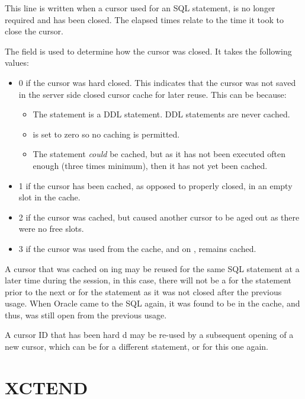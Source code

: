This line is written when a cursor used for an SQL statement, is no longer required and has been closed. The elapsed times relate to the time it took to close the cursor.

The  field is used to determine how the cursor was closed. It takes the following values:

\begin{itemize}
\tightlist
\item
  0 if the cursor was hard closed. This indicates that the cursor was not saved in the server side closed cursor cache for later reuse. This can be because:

  \begin{itemize}
  \tightlist
  \item
    The statement is a DDL statement. DDL statements are never cached.
  \item
     is set to zero so no caching is permitted.
  \item
    The statement \emph{could} be cached, but as it has not been executed often enough (three times minimum), then it has not yet been cached.
  \end{itemize}
\item
  1 if the cursor has been cached, as opposed to properly closed, in an empty slot in the cache.
\item
  2 if the cursor was cached, but caused another cursor to be aged out as there were no free slots.
\item
  3 if the cursor was used from the cache, and on , remains cached.
\end{itemize}

A cursor that was cached on ing may be reused for the same SQL statement at a later time during the session, in this case, there will not be a  for the statement prior to the next  or  for the statement as it was not closed after the previous usage. When Oracle came to  the SQL again, it was found to be in the cache, and thus, was still open from the previous usage.

A cursor ID that has been hard d may be re-used by a subsequent opening of a new cursor, which can be for a different statement, or for this one again. 

\newpage\section{XCTEND}\label{xctend}

